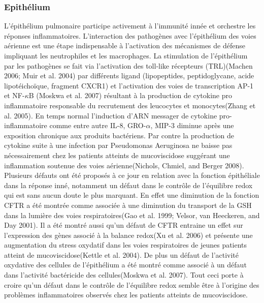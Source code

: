 			\subsubsection{Epithélium}
L’épithélium pulmonaire participe activement à l’immunité innée et orchestre les réponses inflammatoires. L’interaction des pathogènes avec l’épithélium des voies aérienne est une étape indispensable à l’activation des mécanismes de défense impliquant les neutrophiles et les macrophages. La stimulation de l’épithélium par les pathogènes se fait via l’activation des toll-like récepteurs (TRL)(Machen 2006; Muir et al. 2004)\cite{machen_innate_2006}\cite{muir_toll-like_2004} par différents ligand (lipopeptides, peptidoglycane, acide lipotéichoïque, fragment CXCR1) et l’activation des voies de transcription AP-1 et NF-$\kappa$B (Moskwa et al. 2007)\cite{moskwa_novel_2007} résultant à la production de cytokine pro inflammatoire responsable du recrutement des leucocytes et monocytes(Zhang et al. 2005)\cite{zhang_human_2005}. 
En temps normal l’induction d’ARN messager de cytokine pro-inflammatoire comme entre autre IL-8, GRO-$\alpha$, MIP-3 diminue après une exposition chronique aux produits bactériens. Par contre la production de cytokine suite à une infection par Pseudomonas Aeruginosa ne baisse pas nécessairement chez les patients atteints de mucoviscidose suggérant une inflammation soutenue des voies aérienne(Nichols, Chmiel, and Berger 2008)\cite{nichols_chronic_2008}.
Plusieurs défauts ont été proposés à ce jour en relation avec la fonction épithéliale dans la réponse inné, notamment un défaut dans le contrôle de l’équilibre redox qui est sans aucun doute le plus marquant. En effet une diminution de la fonction CFTR a été montrée comme associée à une diminution du transport de la GSH dans la lumière des voies respiratoires(Gao et al. 1999; Velsor, van Heeckeren, and Day 2001)\cite{gao_abnormal_1999}\cite{velsor_antioxidant_2001}. Il a été montré aussi qu’un défaut de CFTR entraine un effet sur l’expression des gènes associé à la balance redox(Xu et al. 2006)\cite{xu_functional_2006} et présente une augmentation du stress oxydatif dans les voies respiratoires de jeunes patients atteint de mucoviscidose(Kettle et al. 2004)\cite{kettle_myeloperoxidase_2004}. De plus un défaut de l’activité oxydative des cellules de l’épithélium a été montré comme associé à un défaut dans l’activité bactéricide des cellules(Moskwa et al. 2007)\cite{moskwa_novel_2007}. Tout ceci porte à croire qu’un défaut dans le contrôle de l’équilibre redox semble être à l’origine des problèmes inflammatoires observés chez les patients atteints de mucoviscidose.




